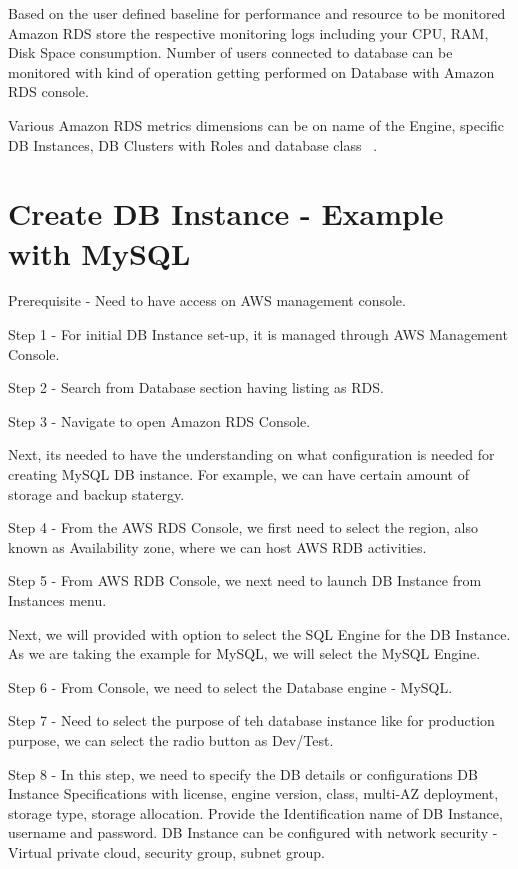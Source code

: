 Based on the user defined baseline for performance and resource to be monitored 
Amazon RDS store the respective monitoring logs including your CPU, RAM, Disk 
Space consumption.
Number of users connected to database can be monitored with kind of operation 
getting performed on Database with Amazon RDS console.  

Various Amazon RDS metrics dimensions can be on name of the Engine, specific 
DB Instances, DB Clusters with Roles and database class
~\cite{hid-sp18-520-amardsmon}.

\section{Create DB Instance - Example with MySQL}

Prerequisite - Need to have access on AWS management console.

Step 1 - For initial DB Instance set-up, it is managed through AWS Management
Console.

Step 2 - Search from Database section having listing as RDS.

Step 3 - Navigate to open Amazon RDS Console.

Next, its needed to have the understanding on what configuration is needed 
for creating MySQL DB instance. For example, we can have certain amount of 
storage and backup statergy.

Step 4  - From the AWS RDS Console, we first need to select the region, also 
known as Availability zone, where we can host AWS RDB activities.

Step 5 - From AWS RDB Console, we next need to launch DB Instance from 
Instances menu.

Next, we will provided with option to select the SQL Engine for the DB 
Instance. As we are taking the example for MySQL, we will select the 
MySQL Engine.

Step 6 - From Console, we need to select the Database engine - MySQL.

Step 7 - Need to select the purpose of teh database instance like for 
production purpose, we can select the radio button as Dev/Test.

Step 8 - In this step, we need to specify the DB details or configurations
DB Instance Specifications with license, engine version, class, multi-AZ 
deployment, storage type, storage allocation.
Provide the Identification name of DB Instance, username and password.
DB Instance can be configured with network security - Virtual private 
cloud, security group, subnet group.

